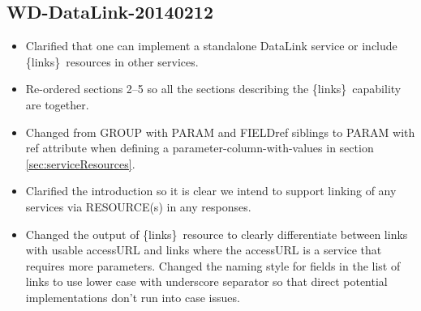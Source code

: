 \documentclass[11pt,a4paper]{ivoa}
\newcommand{\blinks}{\{links\}}
\begin{document}
\subsection{WD-DataLink-20140212}

\begin{itemize}
\item
Clarified that one can implement a standalone DataLink service or include
\blinks\ resources in other services.
\item
Re-ordered sections 2--5 so all the sections describing the
\blinks\ capability are together.
\item
Changed from GROUP with PARAM and FIELDref siblings to PARAM with ref
attribute when defining a parameter-column-with-values in section
\ref{sec:serviceResources}.
\item
Clarified the introduction so it is clear we intend to support linking
of any services via RESOURCE(s) in any responses.
\item
Changed the output of \blinks\ resource to clearly differentiate between
links with usable accessURL and links where the accessURL is a service
that requires more parameters. Changed the naming style for fields in
the list of links to use lower case with underscore separator so that
direct potential implementations don't run into case issues.
\end{itemize}



%
%



\end{document}
